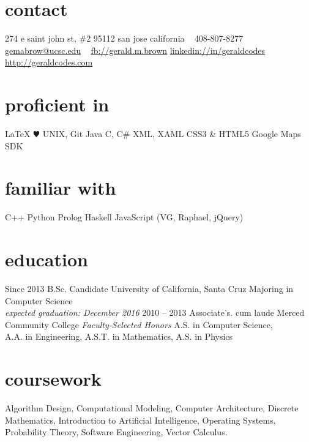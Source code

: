 \documentclass[]{./friggeri-cv}
\begin{document}
       {%
         }


\begin{aside}
  \section{contact}
    274 e saint john st, \#2
    95112 san jose 
    california
    ~
    {408-807-8277} 
    \linespread{1.5}\href{mailto:gemabrow@ucsc.edu}{gemabrow@ucsc.edu}
    ~
    \linespread{1.5}\href{https://www.facebook.com/gerald.m.brown}{fb://gerald.m.brown} 
    \linespread{1.5}\href{http://linkedin.com/in/geraldcodes}{linkedin://in/geraldcodes}
    \linespread{1.5}\href{http://www.geraldcodes.com}{http://geraldcodes.com}
  \section{proficient in}
    \LaTeX
   {\color{red} $\varheartsuit$} %
    UNIX, Git
    Java
    C, C\#
    XML, XAML
    CSS3 \& HTML5
    Google Maps SDK
 \section{familiar with}
    C++
    Python
    Prolog
    Haskell
    JavaScript
    (VG, Raphael, jQuery)
\end{aside}
\section{education}
\begin{entrylist}
  \entry
    {Since 2013}
    {B.Sc. {\normalfont Candidate}}
    {University of California, Santa Cruz}
    {Majoring in Computer Science\\\emph{expected graduation: December 2016}}
  \entry
    {2010 – 2013}
    {Associate's. cum laude}
    {Merced Community College}
    {\emph{Faculty-Selected Honors} A.S. in Computer Science,
    \\A.A. in Engineering, A.S.T. in Mathematics, A.S. in Physics}
\end{entrylist}
\section{coursework}
Algorithm Design, %
Computational Modeling, %
Computer Architecture, %
Discrete Mathematics, %
Introduction to Artificial Intelligence, %
Operating Systems, %
Probability Theory, %
Software Engineering, %
Vector Calculus. %
\end{document}
